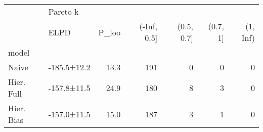 \begin{tabular}{llrrrrr}
\toprule
{} & \multicolumn{4}{l}{Pareto k} \\
{} &         ELPD & P\_loo & (-Inf, 0.5] & (0.5, 0.7] & (0.7, 1] & (1, Inf) \\
model      &              &       &             &            &          &          \\
\midrule
Naive      &  -185.5±12.2 &  13.3 &         191 &          0 &        0 &        0 \\
Hier. Full &  -157.8±11.5 &  24.9 &         180 &          8 &        3 &        0 \\
Hier. Bias &  -157.0±11.5 &  15.0 &         187 &          3 &        1 &        0 \\
\bottomrule
\end{tabular}
